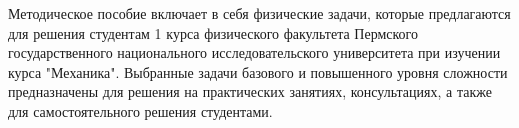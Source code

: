 Методическое пособие включает в себя физические задачи, которые предлагаются для решения студентам 1 курса физического факультета Пермского государственного национального исследовательского университета при изучении курса "Механика". Выбранные задачи базового и повышенного уровня сложности предназначены для решения на практических занятиях, консультациях, а также для самостоятельного решения студентами.